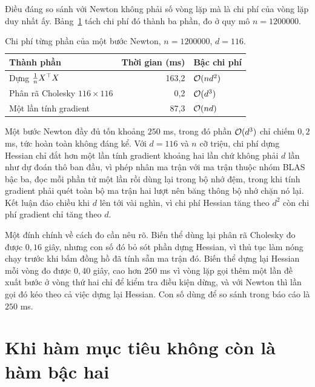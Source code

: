 \documentclass[12pt, a4paper, oneside]{report}
\theoremstyle{definition}
\begin{document}
Điều đáng so sánh với Newton không phải số vòng lặp mà là chi phí của vòng lặp
duy nhất ấy. Bảng~\ref{tab:newtoncost} tách chi phí đó thành ba phần, đo ở quy mô
$n = \num{1200000}$.

\begin{table}[tbp]
  \centering
  \caption{Chi phí từng phần của một bước Newton, $n = \num{1200000}$,
    $d = 116$.}
  \label{tab:newtoncost}
  \begin{tabular}{lrl}
    \toprule
    Thành phần & Thời gian (ms) & Bậc chi phí \\
    \midrule
    Dựng $\frac{1}{n} X^{\top} X$      & 163{,}2 & $\mathcal{O}(nd^{2})$ \\
    Phân rã Cholesky $116 \times 116$ & 0{,}2   & $\mathcal{O}(d^{3})$ \\
    Một lần tính gradient             & 87{,}3  & $\mathcal{O}(nd)$ \\
    \bottomrule
  \end{tabular}
\end{table}

Một bước Newton đầy đủ tốn khoảng $250$ ms, trong đó phần $\mathcal{O}(d^{3})$ chỉ
chiếm $0{,}2$ ms, tức hoàn toàn không đáng kể. Với $d = 116$ và $n$ cỡ triệu, chi
phí dựng Hessian chỉ đắt hơn một lần tính gradient khoảng hai lần chứ không phải
$d$ lần như dự đoán thô ban đầu, vì phép nhân ma trận với ma trận thuộc nhóm BLAS
bậc ba, đọc mỗi phần tử một lần rồi dùng lại trong bộ nhớ đệm, trong khi tính
gradient phải quét toàn bộ ma trận hai lượt nên băng thông bộ nhớ chặn nó lại.
Kết luận đảo chiều khi $d$ lên tới vài nghìn, vì chi phí Hessian tăng theo $d^{2}$
còn chi phí gradient chỉ tăng theo $d$.

Một đính chính về cách đo cần nêu rõ. Biến thể dùng lại phân rã Cholesky đo được
$0{,}16$ giây, nhưng con số đó bỏ sót phần dựng Hessian, vì thủ tục làm nóng chạy
trước khi bấm đồng hồ đã tính sẵn ma trận đó. Biến thể dựng lại Hessian mỗi vòng
đo được $0{,}40$ giây, cao hơn $250$ ms vì vòng lặp gọi thêm một lần đề xuất bước
ở vòng thứ hai chỉ để kiểm tra điều kiện dừng, và với Newton thì lần gọi đó kéo
theo cả việc dựng lại Hessian. Con số dùng để so sánh trong báo cáo là $250$ ms.

\chapter{Khi hàm mục tiêu không còn là hàm bậc hai}\label{ch:huber}
\end{document}
